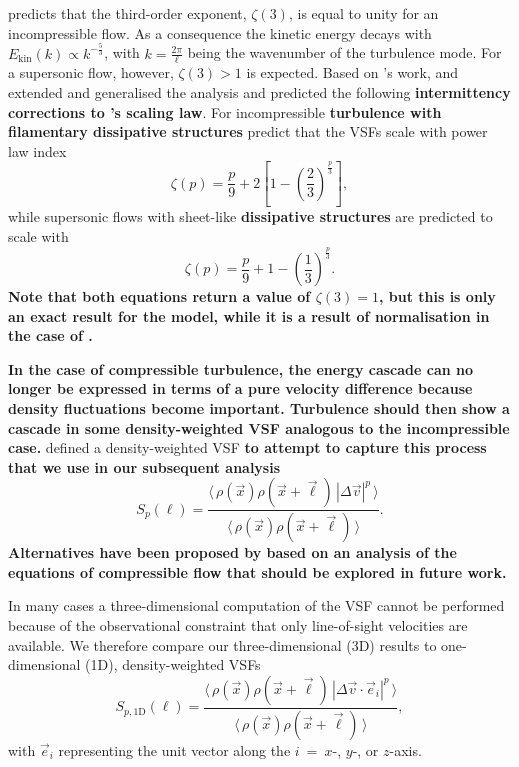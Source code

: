 \citet{Kolmogorov1941} predicts that the third-order exponent, $\zeta(3)$, is equal to unity for an incompressible flow.
As a consequence the kinetic energy decays with $E_{\mathrm{kin}}(k) \propto k^{-\frac{5}{3}}$, with $k = \frac{2 \pi}{\ell}$ being the wavenumber of the turbulence mode.
For a supersonic flow, however, $\zeta(3) >1$ is expected.
Based on \citeauthor{Kolmogorov1941}'s work, \citet{She1994} and \citet{Boldyrev2002} extended and generalised the analysis and predicted the following \textbf{intermittency corrections to \citeauthor{Kolmogorov1941}'s scaling law}.
For incompressible \textbf{turbulence with filamentary dissipative structures} \citet{She1994} predict that
the VSFs scale with power law index
\begin{equation}
	\zeta(p) = \frac{p}{9} + 2 \left[ 1 - \left( \frac{2}{3} \right)^{\frac{p}{3}} \right] ,
	\label{equ:method:she}
\end{equation}
while supersonic flows with sheet-like \textbf{dissipative structures} are predicted to scale with \citep{Boldyrev2002}
\begin{equation}
	\zeta(p) = \frac{p}{9} + 1 - \left( \frac{1}{3} \right)^{\frac{p}{3}}.
	\label{equ:method:boldyrev}
\end{equation}
\textbf{\noindent
    Note that both equations return a value of $\zeta(3) =1$, but this is only an exact result for the \citeauthor{She1994} model, while it is a result of normalisation in the case of \citeauthor{Boldyrev2002}. 
}

\textbf{In the case of compressible turbulence, the energy cascade can no longer be expressed in terms of a pure velocity difference because density fluctuations become important.  Turbulence should then show a cascade in some density-weighted VSF analogous to the incompressible case.}
\citet{Padoan2016a} defined a density-weighted VSF \textbf{to attempt to capture this process that we use in our subsequent analysis}
\begin{equation}
	{S}_p (\ell) = \frac{\langle \, \rho(\vec{x}) \rho(\vec{x}+\vec{\ell}) \, |\Delta \vec{v}|^p  \, \rangle}{\langle  \, \rho(\vec{x}) \rho(\vec{x}+\vec{\ell}) \, \rangle}.
	\label{equ:method:def_vsf_dw}
\end{equation}
\textbf{Alternatives have been proposed by \citet{Kritsuk2013a} based on an analysis of the equations of compressible flow that should be explored in future work.}

In many cases a three-dimensional computation of the VSF cannot be performed because of the observational constraint that only line-of-sight velocities are available.
We therefore compare our three-dimensional (3D) results to one-dimensional (1D), density-weighted VSFs
\begin{equation}
	\mathit{S}_{p,\mathrm{1D}} (\ell) = \frac{\langle \, \rho(\vec{x}) \rho(\vec{x}+\vec{\ell}) \, |\Delta 
        \vec{v} \cdot \vec{e}_i|^p  \, \rangle}{\langle  \, \rho(\vec{x}) \rho(\vec{x}+\vec{\ell}) \, \rangle} ,
	\label{equ:method:def_vsf_1d}
\end{equation}
with $\vec{e}_i$ representing the unit vector along the $i$~=~$x$-, $y$-, or $z$-axis.

